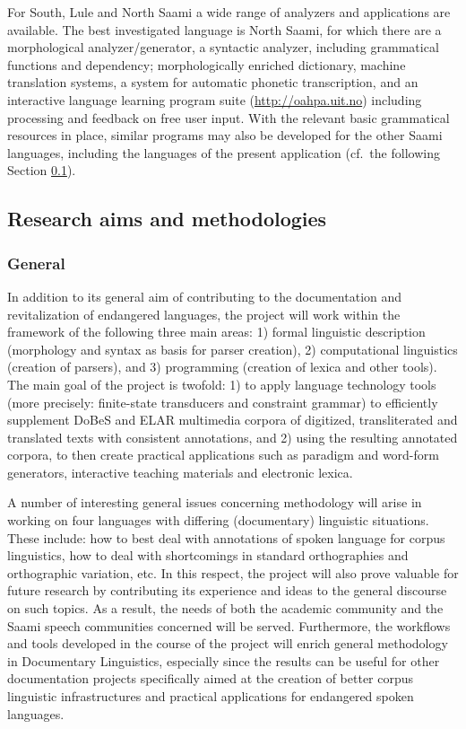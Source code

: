 \documentclass[a4paper,12pt]{article}
\begin{document}
For South, Lule and North Saami a wide range of analyzers and applications are available. The best investigated language is North Saami, for which there are a morphological analyzer/generator, a syntactic analyzer, including grammatical functions and dependency; morphologically enriched dictionary, machine translation systems, a system for automatic phonetic transcription, and an interactive language learning program suite (\url{http://oahpa.uit.no}) including processing and feedback on free user input. With the relevant basic grammatical resources in place, similar programs may also be developed for the other Saami languages, including the languages of the present application (cf.~the following Section \ref{aimsmethod}).

\subsection{Research aims and methodologies}\label{aimsmethod}
\subsubsection{General}%

In addition to its general aim of contributing to the documentation and revitalization of endangered languages, the project will work within the framework of the following three main areas: 1) formal linguistic description (morphology and syntax as basis for parser creation), 2) computational linguistics (creation of parsers), and 3) programming (creation of lexica and other tools). The main goal of the project is twofold: 1) to apply language technology tools (more precisely: finite-state transducers and constraint grammar) to efficiently supplement DoBeS and ELAR multimedia corpora of digitized, transliterated and translated texts with consistent annotations, and 2) using the resulting annotated corpora, to then create practical applications such as paradigm and word-form generators, interactive teaching materials and electronic lexica. 

A number of interesting general issues concerning methodology will arise in working on four languages with differing (documentary) linguistic situations. These include: how to best deal with annotations of spoken language for corpus linguistics, how to deal with shortcomings in standard orthographies and orthographic variation, etc. In this respect, the project will also prove valuable for future research by contributing its experience and ideas to the general discourse on such topics. As a result, the needs of both the academic community and the Saami speech communities concerned will be served. Furthermore, the workflows and tools developed in the course of the project will enrich general methodology in Documentary Linguistics, especially since the results can be useful for other documentation projects specifically aimed at the creation of better corpus linguistic infrastructures and practical applications for endangered spoken languages.
\end{document}
